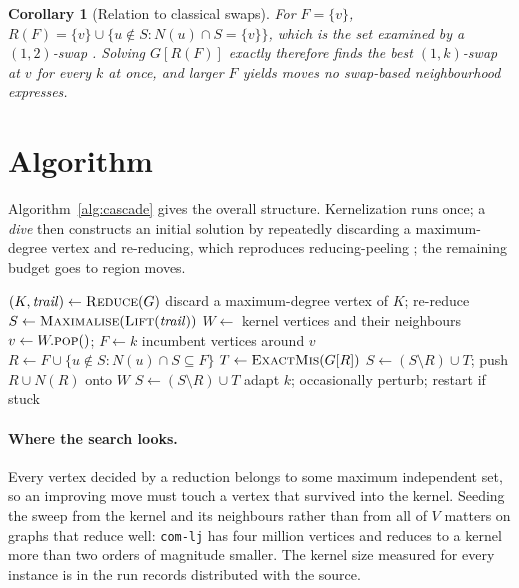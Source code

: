 \documentclass[preprint,12pt]{elsarticle}
\newtheorem{corollary}[theorem]{Corollary}
\theoremstyle{definition}
\begin{document}
\begin{corollary}[Relation to classical swaps]
For $F = \{v\}$, $R(F) = \{v\} \cup \{u \notin S : N(u) \cap S = \{v\}\}$, which
is the set examined by a $(1,2)$-swap \cite{andrade2012}. Solving $G[R(F)]$
exactly therefore finds the best $(1,k)$-swap at $v$ for every $k$ at once, and
larger $F$ yields moves no swap-based neighbourhood expresses.
\end{corollary}

\section{Algorithm}
\label{sec:algorithm}

Algorithm~\ref{alg:cascade} gives the overall structure. Kernelization runs
once; a \emph{dive} then constructs an initial solution by repeatedly discarding
a maximum-degree vertex and re-reducing, which reproduces reducing-peeling
\cite{chang2017}; the remaining budget goes to region moves.

\begin{algorithm}
\caption{\textsc{Cascade}}
\label{alg:cascade}
\begin{algorithmic}[1]
\State $(K,\mathit{trail}) \gets \textsc{Reduce}(G)$ 
 
  \State discard a maximum-degree vertex of $K$; re-reduce
\EndWhile
\State $S \gets \textsc{Maximalise}(\textsc{Lift}(\mathit{trail}))$
\State $W \gets$ kernel vertices and their neighbours 
  \State $v \gets W.\textsc{pop}()$;\; $F \gets k$ incumbent vertices around $v$
  \State $R \gets F \cup \{u \notin S : N(u) \cap S \subseteq F\}$
  \State $T \gets \textsc{ExactMis}(G[R])$ 
   $S \gets (S \setminus R) \cup T$; push $R \cup N(R)$ onto $W$
   $S \gets (S \setminus R) \cup T$
  \EndIf
  \State adapt $k$; occasionally perturb; restart if stuck
\EndWhile
\end{algorithmic}
\end{algorithm}

\paragraph{Where the search looks.} Every vertex decided by a reduction belongs
to some maximum independent set, so an improving move must touch a vertex that
survived into the kernel. Seeding the sweep from the kernel and its neighbours
rather than from all of $V$ matters on graphs that reduce well: \texttt{com-lj}
has four million vertices and reduces to a kernel more than two orders of
magnitude smaller. The kernel size measured for every instance is in the run
records distributed with the source.
\end{document}
